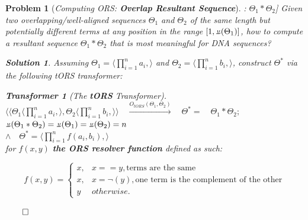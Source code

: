 \documentclass[a4paper, 18pt]{article} %
\newtheorem{transf}{Transformer}
\newtheorem{prob}{Problem}
\newtheorem{soln}{Solution}
\newcommand{\invpi}{\rotatebox[origin=c]{180}{$\pi$}}
\begin{document}
\begin{prob}[\textit{Computing ORS: \textbf{Overlap Resultant Sequence}}]: $\Theta_1 \ast \Theta_2$] 
\label{PROBORS}
Given two overlapping/well-aligned sequences $\Theta_1$ and $\Theta_2$ of the same length but potentially different terms at any position in the range $[1, \invpi(\Theta_1)]$, how to compute a resultant sequence $\Theta_1 \ast \Theta_2$ that is most meaningful for DNA sequences?

\vspace{1em}
\begin{soln}
\label{SOLORS}
Assuming $\Theta_1 = \langle \prod\limits_{i=1}^n a_i, \rangle$ and $\Theta_2 = \langle \prod\limits_{i=1}^n b_i, \rangle$, construct $\Theta^*$ via the following tORS transformer:

\begin{transf}[The \textbf{tORS} Transformer]$ $\\
\label{TRANSFORS}
$\langle\langle \Theta_1\langle \prod\limits_{i=1}^n a_i, \rangle, \Theta_2\langle \prod\limits_{i=1}^n b_i, \rangle \rangle  \quad \xrightarrow{O_{tORS}(\Theta_1,\Theta_2)} \quad \Theta^* = 	 \quad \Theta_1 \ast \Theta_2;$\\
$\invpi(\Theta_1 \ast \Theta_2) = \invpi(\Theta_1) = \invpi(\Theta_2) = n$\\
$\land \quad \Theta^* = \langle \prod\limits_{i=1}^n f(a_i,b_i), \rangle$\\
 for $f(x,y)$ \textbf{the ORS resolver function} defined as such:

\[
f(x,y) = 
\begin{cases}
x, & x == y, \text{terms are the same}\\
x, & x = \lnot(y), \text{one term is the complement of the other}\\
y & otherwise.
\end{cases}
\]

\end{transf}
$\qed$
\vspace{2em}
\end{soln}
\end{prob}

\vspace{2em}
\end{document}
